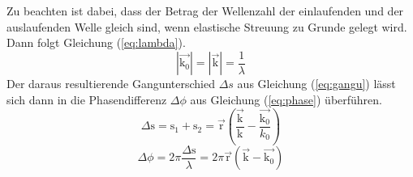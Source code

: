 Zu beachten ist dabei, dass der Betrag der Wellenzahl der einlaufenden und der auslaufenden Welle gleich sind, wenn elastische Streuung zu Grunde gelegt wird. Dann folgt Gleichung (\ref{eq:lambda}).
\begin{equation}
|\vec{\text{k}_0}| = |\vec{\text{k}}| = \frac{1}{\lambda}
\label{eq:lambda}
\end{equation} 
Der daraus resultierende Gangunterschied $\Delta s$ aus Gleichung (\ref{eq:gangu}) lässt sich dann in die Phasendifferenz $\Delta \phi$ aus Gleichung (\ref{eq:phase}) überführen.
\begin{equation}
\Delta \text{s} = \text{s}_1+\text{s}_2 = \vec{\text{r}} \left( \frac{\vec{\text{k}}}{\text{k}} - \frac{\vec{\text{k}_0}}{k_0}  \right)
\label{eq:gangu} 
\end{equation}
\begin{equation}
\Delta \phi = 2\pi\frac{\Delta \text{s}}{\lambda} = 2\pi \vec{\text{r}} (\vec{\text{k}}-\vec{\text{k}_0})
\label{eq:phase} 
\end{equation}


